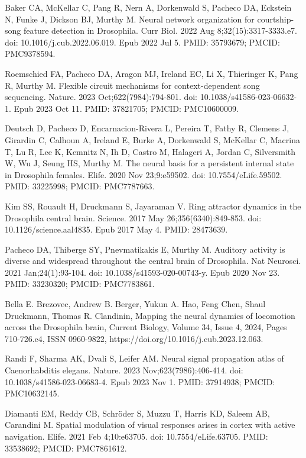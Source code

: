 \documentclass[10pt,letterpaper]{article}
\begin{document}
\begin{thebibliography}{10}
Baker CA, McKellar C, Pang R, Nern A, Dorkenwald S, Pacheco DA, Eckstein N, Funke J, Dickson BJ, Murthy M. Neural network organization for courtship-song feature detection in Drosophila. Curr Biol. 2022 Aug 8;32(15):3317-3333.e7. doi: 10.1016/j.cub.2022.06.019. Epub 2022 Jul 5. PMID: 35793679; PMCID: PMC9378594.

Roemschied FA, Pacheco DA, Aragon MJ, Ireland EC, Li X, Thieringer K, Pang R, Murthy M. Flexible circuit mechanisms for context-dependent song sequencing. Nature. 2023 Oct;622(7984):794-801. doi: 10.1038/s41586-023-06632-1. Epub 2023 Oct 11. PMID: 37821705; PMCID: PMC10600009.

Deutsch D, Pacheco D, Encarnacion-Rivera L, Pereira T, Fathy R, Clemens J, Girardin C, Calhoun A, Ireland E, Burke A, Dorkenwald S, McKellar C, Macrina T, Lu R, Lee K, Kemnitz N, Ih D, Castro M, Halageri A, Jordan C, Silversmith W, Wu J, Seung HS, Murthy M. The neural basis for a persistent internal state in Drosophila females. Elife. 2020 Nov 23;9:e59502. doi: 10.7554/eLife.59502. PMID: 33225998; PMCID: PMC7787663.

Kim SS, Rouault H, Druckmann S, Jayaraman V. Ring attractor dynamics in the Drosophila central brain. Science. 2017 May 26;356(6340):849-853. doi: 10.1126/science.aal4835. Epub 2017 May 4. PMID: 28473639.

Pacheco DA, Thiberge SY, Pnevmatikakis E, Murthy M. Auditory activity is diverse and widespread throughout the central brain of Drosophila. Nat Neurosci. 2021 Jan;24(1):93-104. doi: 10.1038/s41593-020-00743-y. Epub 2020 Nov 23. PMID: 33230320; PMCID: PMC7783861.

Bella E. Brezovec, Andrew B. Berger, Yukun A. Hao, Feng Chen, Shaul Druckmann, Thomas R. Clandinin, Mapping the neural dynamics of locomotion across the Drosophila brain, Current Biology, Volume 34, Issue 4, 2024,
Pages 710-726.e4, ISSN 0960-9822, https://doi.org/10.1016/j.cub.2023.12.063.

Randi F, Sharma AK, Dvali S, Leifer AM. Neural signal propagation atlas of Caenorhabditis elegans. Nature. 2023 Nov;623(7986):406-414. doi: 10.1038/s41586-023-06683-4. Epub 2023 Nov 1. PMID: 37914938; PMCID: PMC10632145.

Diamanti EM, Reddy CB, Schröder S, Muzzu T, Harris KD, Saleem AB, Carandini M. Spatial modulation of visual responses arises in cortex with active navigation. Elife. 2021 Feb 4;10:e63705. doi: 10.7554/eLife.63705. PMID: 33538692; PMCID: PMC7861612.


\end{thebibliography}
\end{document}
